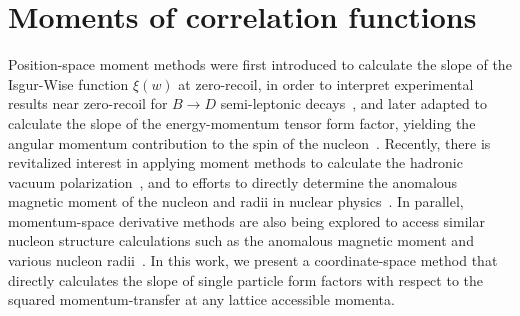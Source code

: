 \documentclass[prd,aps,twocolumn,superscriptaddress,tightenlines,nofootinbib,floatfix,preprintnumbers,10pt]{revtex4-1}
\begin{document}
\section{Moments of correlation functions}
Position-space moment methods were first introduced to calculate the
slope of the Isgur-Wise function $\xi (w)$ at zero-recoil, in order to
interpret experimental results near zero-recoil for $B \rightarrow D$
semi-leptonic decays~\cite{Lellouch:1994zu}, and later adapted to
calculate the slope of the energy-momentum tensor form factor,
yielding the angular momentum contribution to the spin of the
nucleon~\cite{Mathur:1999uf,Gadiyak:2001fe}. Recently, there is
revitalized interest in applying moment methods to calculate the
hadronic vacuum polarization~\cite{Chakraborty:2016mwy,Blum:2016xpd},
and to efforts to directly determine the anomalous magnetic moment of the
nucleon and radii in nuclear physics~\cite{Alexandrou:2016rbj}. In
parallel, momentum-space derivative methods are also being explored to
access similar nucleon structure calculations such as the anomalous
magnetic moment and various nucleon
radii~\cite{deDivitiis:2012vs,Tiburzi:2014yra}. In this work, we
present a coordinate-space method that directly calculates the slope
of single particle form factors with respect to the squared
momentum-transfer at any lattice accessible momenta.
\end{document}
